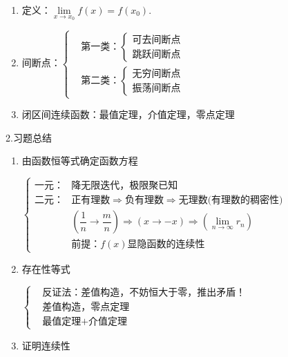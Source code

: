 \documentclass[UTF8]{ctexart}
\numberwithin{equation}{section}
\numberwithin{figure}{section}
\numberwithin{table}{section}
\newcommand\no{\noindent}
\newcommand\dis{\displaystyle}
\newcommand\limit{\dis\lim\limits}
\newcommand\limn{\dis\lim\limits_{n\to\infty}}
\begin{document}
\begin{spacing}{2}
\begin{enumerate}[itemindent=1.4em, label=(\arabic*)]

\item 定义：$\limit_{x\to x_0}f(x)=f(x_0).$

\item $\text{间断点：}\left\{
\begin{aligned}
&\text{第一类：} \left\{ \begin{aligned} \text{可去间断点}\\
\text{跳跃间断点}
\end{aligned}
\right. \\
&\text{第二类：}			%
\left\{ \begin{aligned} \text{无穷间断点}\\
\text{振荡间断点}
\end{aligned}
\right. 
\end{aligned}
\right.$

\item 闭区间连续函数：最值定理，介值定理，零点定理

\end{enumerate}

\no2.习题总结

\begin{enumerate}[itemindent=1.4em, label=(\arabic*)]

\item 由函数恒等式确定函数方程

$\left\{\begin{aligned}
\text{一元：}&\text{降无限迭代，极限聚已知}\\
\text{二元：}&\text{正有理数}\Rightarrow\text{负有理数}\Rightarrow
\text{无理数(有理数的稠密性)}\\
&\left(\dfrac{1}{n}\to\dfrac{m}{n}\right)\Rightarrow
(x\to -x)\Rightarrow\left(\limn r_n\right)\\
&\text{前提：}f(x)\text{显隐函数的连续性}
\end{aligned}\right.$

\item 存在性等式

$\left\{\begin{aligned}
&\text{反证法：差值构造，不妨恒大于零，推出矛盾！}\\
&\text{差值构造，零点定理}\\
&\text{最值定理+介值定理}
\end{aligned}\right.$

\item 证明连续性


\end{enumerate}
\end{spacing}
\end{document}

